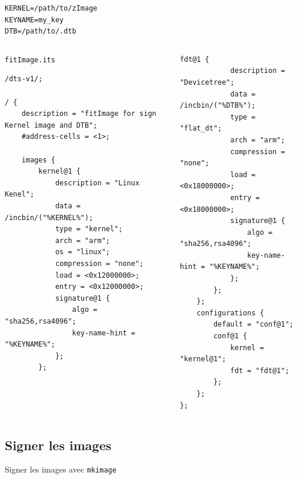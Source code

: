 \documentclass[aspectratio=169]{beamer}
\begin{document}
\begin{frame}[fragile]
\begin{lstlisting}[style=shell,basicstyle=\tiny\ttfamily\color{white}]
KERNEL=/path/to/zImage
KEYNAME=my_key
DTB=/path/to/.dtb
\end{lstlisting}
\begin{columns}
\begin{column}{0.5\textwidth}
\texttt{fitImage.its}
\begin{lstlisting}[style=shell,basicstyle=\tiny\ttfamily\color{white}]
/dts-v1/;

/ {
	description = "fitImage for sign Kernel image and DTB";
	#address-cells = <1>;

	images {
		kernel@1 {
			description = "Linux Kenel";
			data = /incbin/("%KERNEL%");
			type = "kernel";
			arch = "arm";
			os = "linux";
			compression = "none";
			load = <0x12000000>;
			entry = <0x12000000>;
			signature@1 {
				algo = "sha256,rsa4096";
				key-name-hint = "%KEYNAME%";
			};
		};
\end{lstlisting}
\end{column}
\begin{column}{0.5\textwidth}
\begin{lstlisting}[style=shell,basicstyle=\tiny\ttfamily\color{white}]
		fdt@1 {
			description = "Devicetree";
			data = /incbin/("%DTB%");
			type = "flat_dt";
			arch = "arm";
			compression = "none";
			load = <0x18000000>;
			entry = <0x18000000>;
			signature@1 {
				algo = "sha256,rsa4096";
				key-name-hint = "%KEYNAME%";
			};
		};
	};
	configurations {
		default = "conf@1";
		conf@1 {
			kernel = "kernel@1";
			fdt = "fdt@1";
		};
	};
};
\end{lstlisting}
\end{column}
\end{columns}
\end{frame}



\subsection{Signer les images}

\begin{frame}
\begin{center}
\large{Signer les images avec \texttt{mkimage}}
\end{center}
\end{frame}
\end{document}
